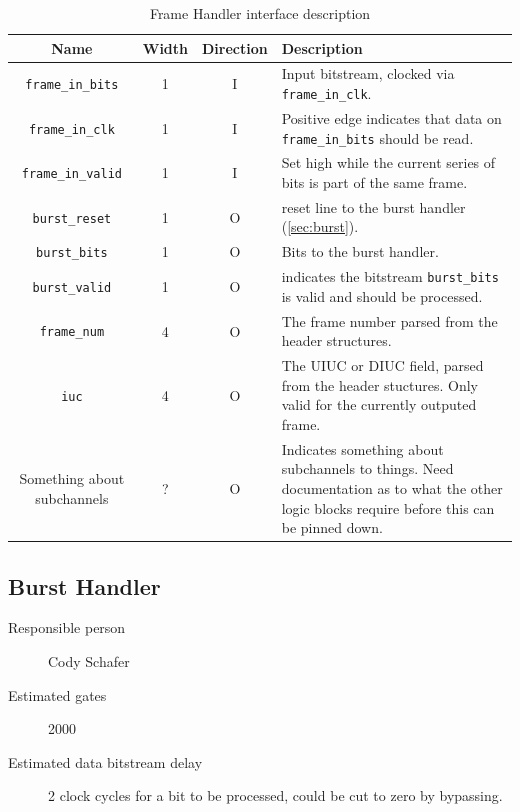 \documentclass[dvips,10pt,twocolumn]{article}
\begin{document}
\begin{table} \begin{tabularx}{\textwidth}{c|c|c|X} \label{tbl:frame-io}
	Name & Width & Direction & Description \\ \hline

	\texttt{frame\_in\_bits} & 1 & I & Input bitstream, clocked via
	\texttt{frame\_in\_clk}. \\

	\texttt{frame\_in\_clk} & 1 & I & Positive edge indicates that data on
	\texttt{frame\_in\_bits} should be read. \\
	
	\texttt{frame\_in\_valid} & 1 & I & Set high while the current series
	of bits is part of the same frame. \\

	\texttt{burst\_reset} & 1 & O & reset line to the burst handler
	(\autoref{sec:burst}). \\

	\texttt{burst\_bits} & 1 & O & Bits to the burst handler. \\

	\texttt{burst\_valid} & 1 & O & indicates the bitstream
	\texttt{burst\_bits} is valid and should be processed. \\


	\texttt{frame\_num} & 4 & O & The frame number parsed from the header
	structures. \\

	\texttt{iuc} & 4 & O & The UIUC or DIUC field, parsed from the header
	stuctures. Only valid for the currently outputed frame. \\

	Something about subchannels & ? & O & Indicates something about
	subchannels to things. Need documentation as to what the other logic
	blocks require before this can be pinned down. 
\end{tabularx} \caption{Frame Handler interface description} \end{table}


\subsection{Burst Handler} \label{sec:burst}
\begin{description}
	\item[Responsible person] Cody Schafer 
	\item[Estimated gates] 2000 
	\item[Estimated data bitstream delay] 2 clock cycles for a bit to be
		processed, could be cut to zero by bypassing.
\end{description}
\end{document}
